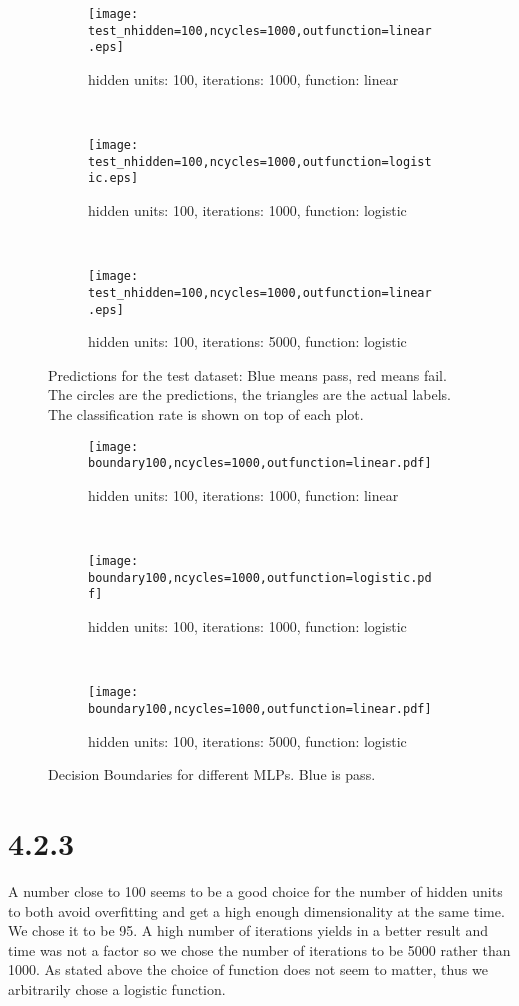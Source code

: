 \documentclass[a4paper,11pt]{article}
\theoremstyle{definition}
\theoremstyle{plain}
\theoremstyle{remark}
\begin{document}
\begin{figure}
\centering
\begin{subfigure}[b]{0.31\textwidth}
\centering
\texttt{[image: test\_nhidden=100,ncycles=1000,outfunction=linear.eps]}
\caption{hidden units: 100, iterations: 1000, function: linear}
\end{subfigure}
~
\begin{subfigure}[b]{0.31\textwidth}
\centering
\texttt{[image: test\_nhidden=100,ncycles=1000,outfunction=logistic.eps]}
\caption{hidden units: 100, iterations: 1000, function: logistic}
\end{subfigure}
~
\begin{subfigure}[b]{0.31\textwidth}
\centering
\texttt{[image: test\_nhidden=100,ncycles=1000,outfunction=linear.eps]}
\caption{hidden units: 100, iterations: 5000, function: logistic}
\end{subfigure}

\caption{Predictions for the test dataset: Blue means pass, red means fail. The circles are the predictions, the triangles are the actual labels. The classification rate is shown on top of each plot.}
\label{fig:4.2.2_test}
\end{figure}

\begin{figure}
\centering
\begin{subfigure}[b]{0.31\textwidth}
\centering
\texttt{[image: boundary100,ncycles=1000,outfunction=linear.pdf]}
\caption{hidden units: 100, iterations: 1000, function: linear}
\end{subfigure}
~
\begin{subfigure}[b]{0.31\textwidth}
\centering
\texttt{[image: boundary100,ncycles=1000,outfunction=logistic.pdf]}
\caption{hidden units: 100, iterations: 1000, function: logistic}
\end{subfigure}
~
\begin{subfigure}[b]{0.31\textwidth}
\centering
\texttt{[image: boundary100,ncycles=1000,outfunction=linear.pdf]}
\caption{hidden units: 100, iterations: 5000, function: logistic}
\end{subfigure}

\caption{Decision Boundaries for different MLPs. Blue is pass.}
\label{fig:4.2.2_bound}
\end{figure}



\section*{4.2.3}
A number close to 100 seems to be a good choice for the number of hidden units to both avoid overfitting and get a high enough dimensionality at the same time. We chose it to be 95. A high number of iterations yields in a better result and time was not a factor so we chose the number of iterations to be 5000 rather than 1000. As stated above the choice of function does not seem to matter, thus we arbitrarily chose a logistic function.
\end{document}

